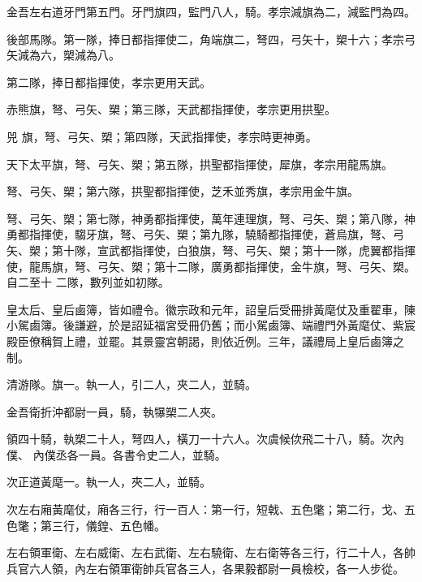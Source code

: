 \begin{pinyinscope}
 金吾左右道牙門第五門。牙門旗四，監門八人，騎。孝宗減旗為二，減監門為四。



 後部馬隊。第一隊，捧日都指揮使二，角端旗二，弩四，弓矢十，槊十六；孝宗弓矢減為六，槊減為八。



 第二隊，捧日都指揮使，孝宗更用天武。



 赤熊旗，弩、弓矢、槊；第三隊，天武都指揮使，孝宗更用拱聖。



 兕
 旗，弩、弓矢、槊；第四隊，天武指揮使，孝宗時更神勇。



 天下太平旗，弩、弓矢、槊；第五隊，拱聖都指揮使，犀旗，孝宗用龍馬旗。



 弩、弓矢、槊；第六隊，拱聖都指揮使，芝禾並秀旗，孝宗用金牛旗。



 弩、弓矢、槊；第七隊，神勇都指揮使，萬年連理旗，弩、弓矢、槊；第八隊，神勇都指揮使，騶牙旗，弩、弓矢、槊；第九隊，驍騎都指揮使，蒼烏旗，弩、弓矢、槊；第十隊，宣武都指揮使，白狼旗，弩、弓矢、槊；第十一隊，虎翼都指揮使，龍馬旗，弩、弓矢、槊；第十二隊，廣勇都指揮使，金牛旗，弩、弓矢、槊。自二至十
 二隊，數列並如初隊。



 皇太后、皇后鹵簿，皆如禮令。徽宗政和元年，詔皇后受冊排黃麾仗及重翟車，陳小駕鹵簿。後謙避，於是詔延福宮受冊仍舊；而小駕鹵簿、端禮門外黃麾仗、紫宸殿臣僚稱賀上禮，並罷。其景靈宮朝謁，則依近例。三年，議禮局上皇后鹵簿之制。



 清游隊。旗一。執一人，引二人，夾二人，並騎。



 金吾衛折沖都尉一員，騎，執犦槊二人夾。



 領四十騎，執槊二十人，弩四人，橫刀一十六人。次虞候佽飛二十八，騎。次內僕、
 內僕丞各一員。各書令史二人，並騎。



 次正道黃麾一。執一人，夾二人，並騎。



 次左右廂黃麾仗，廂各三行，行一百人：第一行，短戟、五色氅；第二行，戈、五色氅；第三行，儀鍠、五色幡。



 左右領軍衛、左右威衛、左右武衛、左右驍衛、左右衛等各三行，行二十人，各帥兵官六人領，內左右領軍衛帥兵官各三人，各果毅都尉一員檢校，各一人步從。




\end{pinyinscope}

